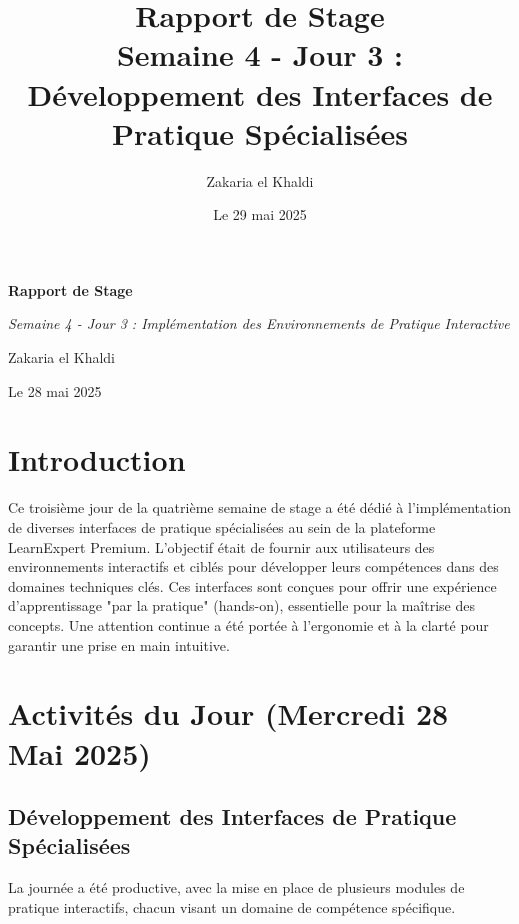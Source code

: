 \documentclass[12pt, a4paper]{article}
\title{\Huge\bfseries\color{primary} Rapport de Stage \\ 
      \Large Semaine 4 - Jour 3 : Développement des Interfaces de Pratique Spécialisées} %
\author{\Large Zakaria el Khaldi}
\date{\large Le 29 mai 2025} %
\begin{document}
\begin{titlepage}
  \centering
  {\Huge\bfseries\color{primary} Rapport de Stage \par}
  \vspace{1cm}
  {\Large\itshape Semaine 4 - Jour 3 : Implémentation des Environnements de Pratique Interactive\par} %
  \vspace{2cm}
  
  \vspace{2cm}
  {\Large Zakaria el Khaldi\par}
  \vfill
  {\large Le 28 mai 2025\par} %
\end{titlepage}

\tableofcontents
\thispagestyle{empty}
\newpage

\section{Introduction}
\thispagestyle{fancy}
Ce troisième jour de la quatrième semaine de stage a été dédié à l'implémentation de diverses interfaces de pratique spécialisées au sein de la plateforme LearnExpert Premium. L'objectif était de fournir aux utilisateurs des environnements interactifs et ciblés pour développer leurs compétences dans des domaines techniques clés. Ces interfaces sont conçues pour offrir une expérience d'apprentissage "par la pratique" (hands-on), essentielle pour la maîtrise des concepts. Une attention continue a été portée à l'ergonomie et à la clarté pour garantir une prise en main intuitive.

\section{Activités du Jour (Mercredi 28 Mai 2025)} %

\subsection{Développement des Interfaces de Pratique Spécialisées}
La journée a été productive, avec la mise en place de plusieurs modules de pratique interactifs, chacun visant un domaine de compétence spécifique.
\end{document}
